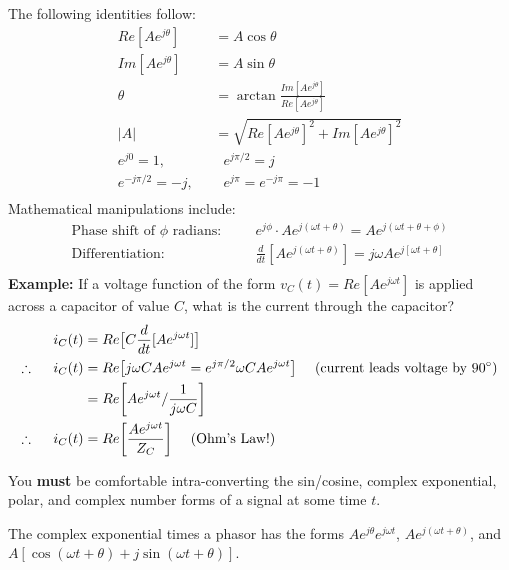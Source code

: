 The following identities follow:
\begin{equation}
\begin{split}
Re[Ae^{j\theta}] &= A \cos\theta\\
Im[Ae^{j\theta}] &= A \sin\theta\\
\theta &= \arctan\frac{Im[Ae^{j\theta}]}{Re[Ae^{j\theta}]}\\
|A| &= \sqrt{Re[Ae^{j\theta}]^2+Im[Ae^{j\theta}]^2}\\
e^{j0} = 1,~~~&~~~e^{j\pi/2} = j\\
e^{-j\pi/2} = -j,~~~&~~~e^{j\pi} = e^{-j\pi} =-1\\
\end{split}
\end{equation}
Mathematical manipulations include:
\begin{equation}
\begin{split}
\text{Phase shift of } \phi \text{ radians:~~~~~}& e^{j\phi}\cdot
Ae^{j(\omega t + \theta)} = Ae^{j(\omega t + \theta+\phi)}\\
\text{Differentiation:~~~~~}&
\frac{d}{dt}[Ae^{j(\omega t + \theta)}] = j\omega Ae^{j[\omega t + \theta]}\\
\end{split}
\end{equation}
\textbf{Example:} If a voltage function of the form $v_{C}(t) =
Re[Ae^{j\omega t}]$ is applied across a capacitor of value $C$, what is
the current through the capacitor?
\begin{equation}
\begin{split}
i_{C}(t) &= Re\big{[}C\frac{d}{dt}[Ae^{j\omega t}]\big{]}\\
\therefore ~~~~i_{C}(t) &= Re\big{[}j\omega C Ae^{j\omega t} = e^{j \pi/2}\omega C Ae^{j\omega t}\big{]}
~~~~(\text{current leads voltage by }90^\circ) \\
&= Re\bigg{[}Ae^{j\omega t} / \frac{1}{j\omega C}\bigg{]}\\
\therefore ~~~~i_{C}(t)&= Re\bigg{[}\frac{Ae^{j\omega t}}{Z_C}\bigg{]}~~~~\text{(Ohm's Law!)} 
\end{split}
\end{equation}

You \textbf{must} be comfortable intra-converting the sin/cosine,
complex exponential, polar, and complex number forms of a signal at some time
$t$.

The complex exponential times a phasor has the forms
$Ae^{j\theta}e^{j\omega t}$, $Ae^{j(\omega t + \theta)}$, and
$A[\cos(\omega t+\theta) + j\sin(\omega t+\theta)]$.

